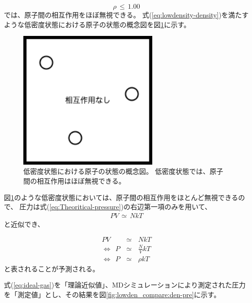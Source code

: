 \documentclass[titlepage]{jsreport}
\begin{document}
{{{\large
\begin{equation}
\rho\,{\leq}\,1.00 \label{eq:lowdensity-density}
\end{equation}
\normalsize
では、原子間の相互作用をほぼ無視できる。
式(\ref{eq:lowdensity-density})を満たすような低密度状態における原子の状態の概念図を図\ref{fig:lowdensity.png}に示す。

\begin{figure}[htbp]
    \begin{center}
        \includegraphics[width=7cm]{fig/lowdensity.png}
    \end{center}
    \caption{低密度状態における原子の状態の概念図。
    低密度状態では、原子間の相互作用はほぼ無視できる。}
    \label{fig:lowdensity.png}
\end{figure}

図\ref{fig:lowdensity.png}のような低密度状態においては、原子間の相互作用をほとんど無視できるので、
圧力は式(\ref{eq:Theoritical-pressure})の右辺第一項のみを用いて、
\large
\begin{eqnarray}
PV\,{\simeq}\,NkT　\nonumber
\end{eqnarray}
\normalsize
と近似でき、

\newpage
\large
\begin{eqnarray}
PV\,&{\simeq}&\,NkT\nonumber\\
{\Leftrightarrow}{\ }{\ }P\,&{\simeq}&\,{\frac{N}{V}}kT\nonumber\\
{\Leftrightarrow}{\ }{\ }P\,&{\simeq}&\,{\rho}kT \label{eq:ideal-gas}
\end{eqnarray}
\normalsize
と表されることが予測される。

式(\ref{eq:ideal-gas})を「理論近似値」、MDシミュレーションにより測定された圧力を「測定値」とし、その結果を図\ref{fig:lowden_compare:den-pre}に示す。

}}}
\end{document}
